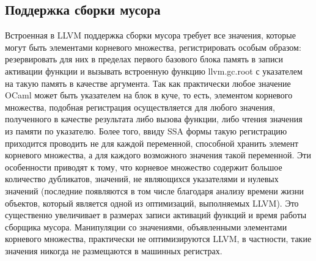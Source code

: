 \documentclass[a4paper, 12pt]{article}
\begin{document}
\subsection{Поддержка сборки мусора}
Встроенная в LLVM поддержка сборки мусора требует все значения, которые могут быть элементами корневого множества,
регистрировать особым образом: резервировать для них в пределах первого базового блока память в записи активации функции
и вызывать встроенную функцию llvm.gc.root с указателем на такую память в качестве аргумента. Так как практически любое
значение OCaml может быть указателем на блок в куче, то есть, элементом корневого множества, подобная регистрация
осуществляется для любого значения, полученного в качестве результата либо вызова функции, либо чтения значения из
памяти по указателю. Более того, ввиду SSA формы такую регистрацию приходится проводить не для каждой переменной,
способной хранить элемент корневого множества, а для каждого возможного значения такой переменной. Эти особенности
приводят к тому, что корневое множество содержит большое количество дубликатов, значений, не являющихся указателями и
нулевых значений (последние появляются в том числе благодаря анализу времени жизни объектов, который является одной из
оптимизаций, выполняемых LLVM). Это существенно увеличивает в размерах записи активаций функций и время работы сборщика
мусора. Манипуляции со значениями, объявленными элементами корневого множества, практически не оптимизируются LLVM, в
частности, такие значения никогда не размещаются в машинных регистрах.
\end{document}

